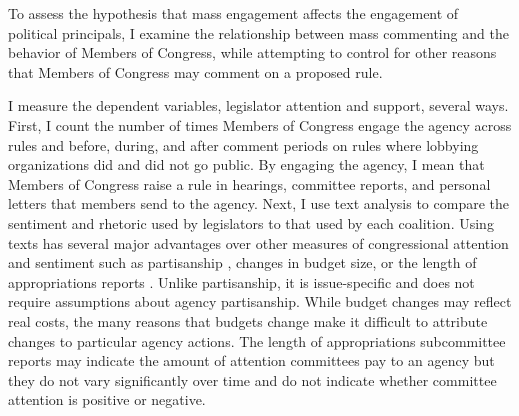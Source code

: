 
To assess the hypothesis that mass engagement affects the engagement of political principals, I examine the relationship between mass commenting and the behavior of Members of Congress, while attempting to control for other reasons that Members of Congress may comment on a proposed rule.



I measure the dependent variables, legislator attention and support, several ways. First, I count the number of times Members of Congress engage the agency across rules and before, during, and after comment periods on rules where lobbying organizations did and did not go public. By engaging the agency, I mean that Members of Congress raise a rule in hearings, committee reports, and personal letters that members send to the agency. 
Next, I use text analysis to compare the sentiment and rhetoric used by legislators to that used by each coalition.%
Using texts has several major advantages over other measures of congressional attention and sentiment such as partisanship \citep{Yaver2016,Lewis2008}, changes in budget size, or the length of appropriations reports \citep{Bolton2015}. Unlike partisanship, it is issue-specific and does not require assumptions about agency partisanship. While budget changes may reflect real costs, the many reasons that budgets change make it difficult to attribute changes to particular agency actions. The length of appropriations subcommittee reports may indicate the amount of attention committees pay to an agency but they do not vary significantly over time and do not indicate whether committee attention is positive or negative.

